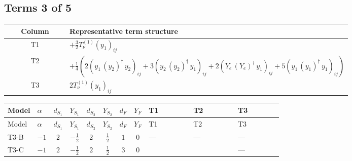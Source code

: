 \documentclass[8pt]{article}
\begin{document}
\begin{landscape}
\subsection*{Terms 3 of 5}
\begin{center}
\begin{tabular}{@{}c >{\raggedright\arraybackslash}p{0.82\linewidth}@{}}
\toprule
Column & Representative term structure \\
\midrule
T1 & \(\displaystyle +\frac{3}{2} T_{\nu}^{(1)} \left({y_1}\right)_{ij}\) \\
\midrule
T2 & \(\displaystyle +\frac{1}{4} (2 \left({y_1}\,\left({y_2}\right)^{\dagger}\,{y_2}\right)_{ij}+3 \left({y_2}\,\left({y_2}\right)^{\dagger}\,{y_1}\right)_{ij}+2 \left({Y_e}\,\left({Y_e}\right)^{\dagger}\,{y_1}\right)_{ij}+5 \left({y_1}\,\left({y_1}\right)^{\dagger}\,{y_1}\right)_{ij})\) \\
\midrule
T3 & \(\displaystyle 2 T_{\nu}^{(1)} \left({y_1}\right)_{ij}\) \\
\midrule
\bottomrule
\end{tabular}
\end{center}
\smallskip
\tiny
\begin{longtable}{@{}llcccccc >{\raggedright\arraybackslash}p{0.21\linewidth} >{\raggedright\arraybackslash}p{0.21\linewidth} >{\raggedright\arraybackslash}p{0.21\linewidth}@{}}
\toprule
Model & $\alpha$ & $d_{S_1}$ & $Y_{S_1}$ & $d_{S_2}$ & $Y_{S_2}$ & $d_F$ & $Y_F$ & T1 & T2 & T3 \\
\midrule
\endfirsthead
\toprule
Model & $\alpha$ & $d_{S_1}$ & $Y_{S_1}$ & $d_{S_2}$ & $Y_{S_2}$ & $d_F$ & $Y_F$ & T1 & T2 & T3 \\
\midrule
\endhead
T3-B & $-1$ & $2$ & $-\frac{1}{2}$ & $2$ & $\frac{1}{2}$ & $1$ & $0$ & --- & --- & --- \\
\midrule
T3-C & $-1$ & $2$ & $-\frac{1}{2}$ & $2$ & $\frac{1}{2}$ & $3$ & $0$ & \scriptsize\adjustbox{max width=\linewidth}{$\begin{gathered} +\frac{3}{2} T_{\nu}^{(1)} \left({y_1}\right)_{ij}\end{gathered}$} & \scriptsize\adjustbox{max width=\linewidth}{$\begin{gathered} +\frac{1}{4} (2 \left({y_1}\,\left({y_2}\right)^{\dagger}\,{y_2}\right)_{ij}+3 \left({y_2}\,\left({y_2}\right)^{\dagger}\,{y_1}\right)_{ij}+2 \left({Y_e}\,\left({Y_e}\right)^{\dagger}\,{y_1}\right)_{ij}+5 \left({y_1}\,\left({y_1}\right)^{\dagger}\,{y_1}\right)_{ij})\end{gathered}$} & --- \\

\end{longtable}
\end{landscape}
\end{document}
